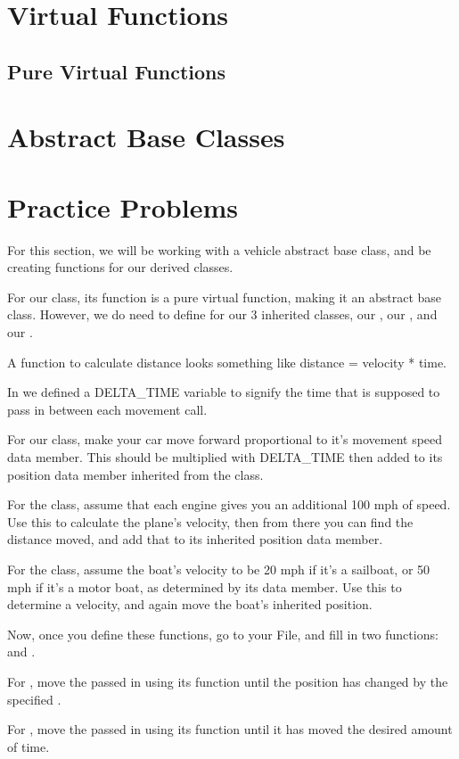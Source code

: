 \documentclass{tufte-handout}
\begin{document}
\section{Virtual Functions}

\subsection{Pure Virtual Functions}

\section{Abstract Base Classes}


\section{Practice Problems}
For this section, we will be working with a vehicle abstract base class, and be creating functions for our derived classes.

For our  class, its  function is a pure virtual function, making it an abstract base class.
However, we do need to define  for our 3 inherited classes, our , our , and our .

A function to calculate distance looks something like distance = velocity * time.

In  we defined a DELTA\_TIME variable to signify the time that is supposed to pass in between each movement call.


For our  class, make your car move forward proportional to it's movement speed data member.
This should be multiplied with DELTA\_TIME then added to its position data member inherited from the  class.

For the  class, assume that each engine gives you an additional 100 mph of speed.
Use this to calculate the plane's velocity, then from there you can find the distance moved, and add that to its inherited position data member.

For the  class, assume the boat's velocity to be 20 mph if it's a sailboat, or 50 mph if it's a motor boat, as determined by its  data member.
Use this to determine a velocity, and again move the boat's inherited position.


Now, once you define these functions, go to your  File, and fill in two functions:
 and .

For , move the  passed in using its  function until the position has changed by the specified .

For , move the  passed in using its  function until it has moved the desired amount of time.
\end{document}
